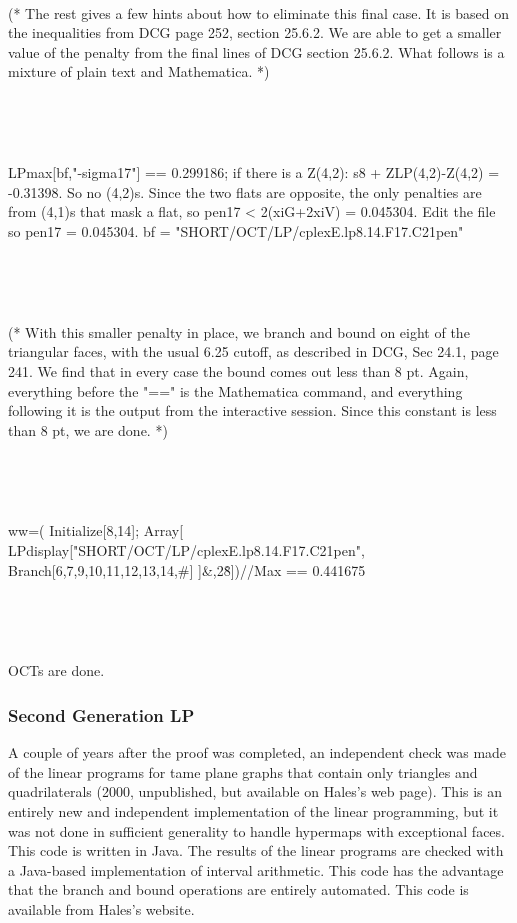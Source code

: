 {\

(* The rest gives a few hints about how to eliminate this final
case.  It is based on the inequalities from DCG page 252, section
25.6.2. We are able to get a smaller value of the penalty from the
final lines of DCG section 25.6.2.  What follows is a mixture of
plain text and Mathematica.  *)

\

\

LPmax[bf,"-sigma{17}"] == 0.299186; if there is a Z(4,2):   s8 +
ZLP(4,2)-Z(4,2) = -0.31398. So no (4,2)s.  Since the two flats are
opposite, the only penalties
    are from (4,1)s that mask a flat, so pen17 < 2(xiG+2xiV) = 0.045304.
    Edit the file so pen17 = 0.045304.
bf = "SHORT/OCT/LP/cplexE.lp8.14.F17.C21pen"

\

\

(* With this smaller penalty in place, we branch and bound on
eight of the triangular faces, with the usual 6.25 cutoff, as
described in DCG, Sec 24.1, page 241. We find that in every case
the bound comes out less than 8 pt. Again, everything before the
"==" is the Mathematica command, and everything following it is
the output from the interactive session.  Since this constant is
less than 8 pt, we are done. *)

\

\

ww=( Initialize[8,14]; Array[
LPdisplay["SHORT/OCT/LP/cplexE.lp8.14.F17.C21pen",
    Branch[{6,7,9,10,11,12,13,14},\#] ]\&,2\^8])//Max ==  0.441675

\

\

OCTs are done.

}




\subsubsection{Second Generation LP}

A couple of years after the proof was completed, an independent
check was made of the linear programs for tame plane graphs that
contain only triangles and quadrilaterals (2000, unpublished, but
available on Hales's web page). This is an entirely new and
independent implementation of the linear programming, but it was
not done in sufficient generality to handle hypermaps with
exceptional faces. This code is written in Java.  The results of
the linear programs are checked with a Java-based implementation
of interval arithmetic. This code has the advantage that the
branch and bound operations are entirely automated.  This code is
available from Hales's website.

